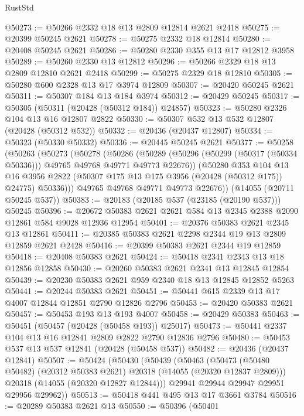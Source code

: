 \begin{lexlean}{RustStd}
\begin{coremodule}
@50273 := @50266 @2332 @18 @13 @2809 @12814 @2621 @2418
@50275 := @20399 @50245 @2621
@50278 := @50275 @2332 @18 @12814
@50280 := @20408 @50245 @2621
@50286 := @50280 @2330 @355 @13 @17 @12812 @3958
@50289 := @50260 @2330 @13 @12812
@50296 := @50266 @2329 @18 @13 @2809 @12810 @2621 @2418
@50299 := @50275 @2329 @18 @12810
@50305 := @50280 @600 @2328 @13 @17 @3974 @12809
@50307 := @20420 @50245 @2621
@50311 := @50307 @184 @13 @184 @3974
@50312 := @20429 @50245
@50317 := @50305 (@50311 (@20428 (@50312 @184)) @24857)
@50323 := @50280 @2326 @104 @13 @16 @12807 @2822
@50330 := @50307 @532 @13 @532 @12807 (@20428 (@50312 @532))
@50332 := @20436 (@20437 @12807)
@50334 := @50323 (@50330 @50332)
@50336 := @20445 @50245 @2621
@50377 := @50258
    (@50263
      (@50273
        (@50278
          (@50286
            (@50289 (@50296 (@50299 (@50317 (@50334 @50336))) @49765 @49768 @49771 @49773 @22676))
            (@50280
              @353
              @104
              @13
              @16
              @3956
              @2822
              (@50307 @175 @13 @175 @3956 (@20428 (@50312 @175)) @24775)
              @50336)))
        @49765
        @49768
        @49771
        @49773
        @22676))
    (@14055 (@20711 @50245 @537))
@50383 := @20183 (@20185 @537 (@23185 (@20190 @537))) @50245
@50396 := @20672 @50383 @2621 @2621 @584 @13 @2345 @2388 @2090 @12861 @584 @9028 @12936 @12954
@50401 := @20376 @50383 @2621 @2345 @13 @12861
@50411 := @20385 @50383 @2621 @2298 @2344 @19 @13 @2809 @12859 @2621 @2428
@50416 := @20399 @50383 @2621 @2344 @19 @12859
@50418 := @20408 @50383 @2621
@50424 := @50418 @2341 @2343 @13 @18 @12856 @12858
@50430 := @20260 @50383 @2621 @2341 @13 @12845 @12854
@50439 := @20230 @50383 @2621 @959 @2340 @18 @13 @12845 @12852 @5263
@50441 := @20244 @50383 @2621
@50451 := @50441 @615 @2339 @13 @17 @4007 @12844 @12851 @2790 @12826 @2796
@50453 := @20420 @50383 @2621
@50457 := @50453 @193 @13 @193 @4007
@50458 := @20429 @50383
@50463 := @50451 (@50457 (@20428 (@50458 @193)) @25017)
@50473 := @50441 @2337 @104 @13 @16 @12841 @2809 @2822 @2790 @12836 @2796
@50480 := @50453 @537 @13 @537 @12841 (@20428 (@50458 @537))
@50482 := @20436 (@20437 @12841)
@50507 := @50424
    (@50430
      (@50439
        (@50463
          (@50473 (@50480 @50482) (@20312 @50383 @2621) @20318 (@14055 (@20320 @12837 @2809)))
          @20318
          (@14055 (@20320 @12827 @12844)))
        @29941
        @29944
        @29947
        @29951
        @29956
        @29962))
@50513 := @50418 @441 @495 @13 @17 @3661 @3784
@50516 := @20289 @50383 @2621 @13
@50550 := @50396
    (@50401

\end{coremodule}
\end{lexlean}
